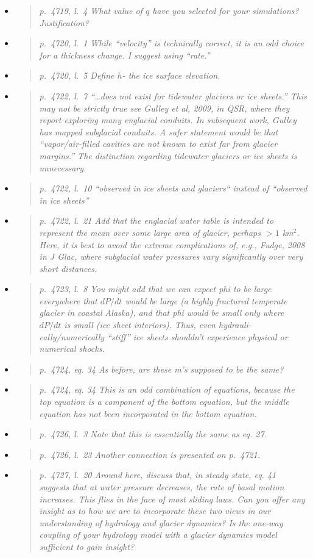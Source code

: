 \documentclass[11pt,reqno]{amsart}
\newcommand{\reply}[2]{
\medskip\medskip
\item  \begin{quote}
\emph{#1}
\end{quote}

\medskip
\noindent #2}
\begin{document}
\begin{itemize}
\reply{p.~4719, l.~4 What value of $q$ have you selected for your simulations? Justification?}
{}

\reply{p.~4720, l.~1  While ``velocity'' is technically correct, it is an odd choice for a thickness
change. I suggest using ``rate.''}
{}

\reply{p.~4720, l.~5 Define $h$- the ice surface elevation.}
{}

\reply{p.~4722, l.~7 ``\dots does not exist for tidewater glaciers or ice sheets.'' This may not
be strictly true see Gulley et al, 2009, in QSR, where they report exploring many
englacial conduits. In subsequent work, Gulley has mapped subglacial conduits. A
safer statement would be that ``vapor/air-filled cavities are not known to exist far from
glacier margins.''  The distinction regarding tidewater glaciers or ice sheets is unnecessary.}
{}

\reply{p.~4722, l.~10 ``observed in ice sheets and glaciers`` instead of ``observed in ice sheets''}
{}

\reply{p.~4722, l.~21 Add that the englacial water table is intended to represent the mean
over some large area of glacier, perhaps $>1$ km$^2$. Here, it is best to avoid the extreme
complications of, e.g., Fudge, 2008 in J Glac, where subglacial water pressures vary
significantly over very short distances.}
{}

\reply{p.~4723, l.~8 You might add that we can expect phi to be large everywhere that $dP/dt$
would be large (a highly fractured temperate glacier in coastal Alaska), and that phi
would be small only where $dP/dt$ is small (ice sheet interiors). Thus, even hydrauli-
cally/numerically ``stiff'' ice sheets shouldn’t experience physical or numerical shocks.}
{}

\reply{p.~4724, eq. 34 As before, are these m's supposed to be the same?}
{}

\reply{p.~4724, eq. 34 This is an odd combination of equations, because the top equation is a
component of the bottom equation, but the middle equation has not been incorporated
in the bottom equation.}
{}

\reply{p.~4726, l.~3 Note that this is essentially the same as eq. 27.}
{}

\reply{p.~4726, l.~23 Another connection is presented on p.~4721.}
{}

\reply{p.~4727, l.~20 Around here, discuss that, in steady state, eq. 41 suggests that at water
pressure decreases, the rate of basal motion increases. This flies in the face of most
sliding laws. Can you offer any insight as to how we are to incorporate these two views
in our understanding of hydrology and glacier dynamics? Is the one-way coupling of
your hydrology model with a glacier dynamics model sufficient to gain insight?}
{}


\end{itemize}
\end{document}
